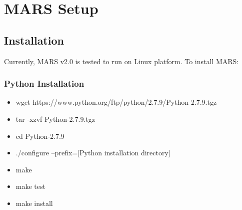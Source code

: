 \section{MARS Setup}

\subsection{Installation}


Currently, MARS v2.0 is tested to run on Linux platform. To install MARS:

\subsubsection{Python Installation}
\begin{itemize}
\item wget https://www.python.org/ftp/python/2.7.9/Python-2.7.9.tgz
\item tar -xzvf Python-2.7.9.tgz
\item cd Python-2.7.9
\item ./configure --prefix=[Python installation directory]
\item make
\item make test
\item make install

\end{itemize}


